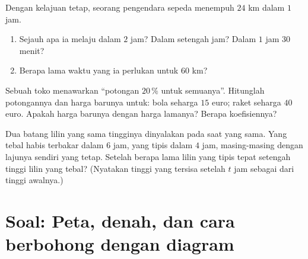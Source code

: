 \begin{exercise}[$\star\star$]\label{exo:g6:propdata:10}
Dengan kelajuan tetap, seorang pengendara sepeda menempuh $24$ km dalam $1$ jam.
\begin{enumerate}
  \item Sejauh apa ia melaju dalam $2$ jam? Dalam setengah jam? Dalam
        $1$ jam $30$ menit?
  \item Berapa lama waktu yang ia perlukan untuk $60$ km?
\end{enumerate}
\end{exercise}

\begin{exercise}[$\star\star$]\label{exo:g6:propdata:11}
Sebuah toko menawarkan ``potongan $20\,\%$ untuk semuanya''. Hitunglah
potongannya dan harga barunya untuk: bola seharga $15$ euro; raket
seharga $40$ euro. Apakah harga barunya  dengan harga
lamanya? Berapa koefisiennya?
\end{exercise}

\begin{exercise}[$\star\star\star$]\label{exo:g6:propdata:12}
Dua batang lilin yang sama tingginya dinyalakan pada saat yang sama.
Yang tebal habis terbakar dalam $6$ jam, yang tipis dalam $4$ jam,
masing-masing dengan lajunya sendiri yang tetap. Setelah berapa lama
lilin yang tipis tepat setengah tinggi lilin yang tebal? (Nyatakan
tinggi yang tersisa setelah $t$ jam sebagai  dari tinggi awalnya.)
\end{exercise}

\section{Soal: Peta, denah, dan cara berbohong dengan diagram}

